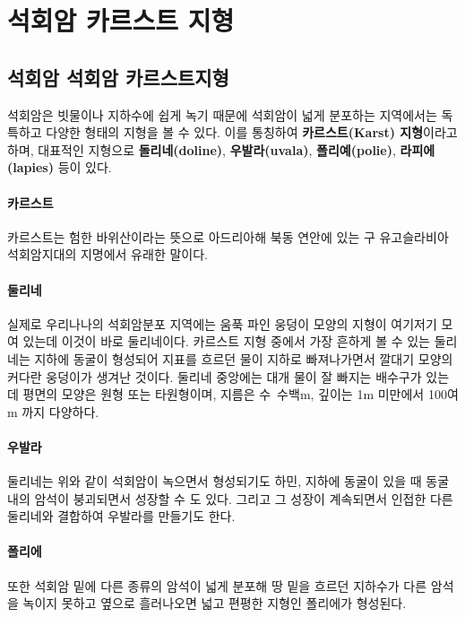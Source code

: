 \documentclass[12pt, a4paper, twoside]{book}
\begin{document}
	\clearpage
	\section{석회암 카르스트 지형}



		\subsection{석회암  석회암 카르스트지형}


			석회암은 빗물이나 지하수에 쉽게 녹기 때문에 석회암이 넓게 분포하는 지역에서는 독특하고 다양한 형태의 지형을 볼 수 있다. 
			이를 통칭하여 \textbf{카르스트(Karst) 지형}이라고 하며, 대표적인 지형으로 \textbf{돌리네(doline)}, \textbf{우발라(uvala)}, \textbf{폴리예(polie)}, \textbf{라피에(lapies)} 등이 있다.
			
			
			\paragraph{카르스트}
			카르스트는 험한 바위산이라는 뜻으로 아드리아해 북동 연안에 있는 구 유고슬라비아 석회암지대의 지명에서 유래한 말이다.
			
			\paragraph{둘리네}
			실제로 우리나나의 석회암분포 지역에는 움푹 파인 웅덩이 모양의 지형이 여기저기 모여 있는데 이것이 바로 둘리네이다. 
			카르스트 지형 중에서 가장 흔하게 볼 수 있는 둘리네는 지하에 동굴이 형성되어 지표를 흐르던 물이 지하로 빠져나가면서 깔대기 모양의 커다란 웅덩이가 생겨난 것이다. 
			둘리네 중앙에는 대개 물이 잘 빠지는 배수구가 있는데 평면의 모양은 원형 또는 타원형이며, 지름은 수~수백m, 깊이는 1m 미만에서 100여m 까지 다양하다.
			
			\paragraph{우발라}
			둘리네는 위와 같이 석회암이 녹으면서 형성되기도 하민, 지하에 동굴이 있을 때 동굴 내의 암석이 붕괴되면서 성장할 수 도 있다. 그리고 그 성장이 계속되면서 인접한 다른 둘리네와 결합하여 우발라를 만들기도 한다. 
			
			\paragraph{폴리에}
			또한 석회암 밑에 다른 종류의 암석이 넓게 분포해 땅 밑을 흐르던 지하수가 다른 암석을 녹이지 못하고 옆으로 흘러나오면 넓고 편평한 지형인 폴리에가 형성된다.
			
\end{document}
